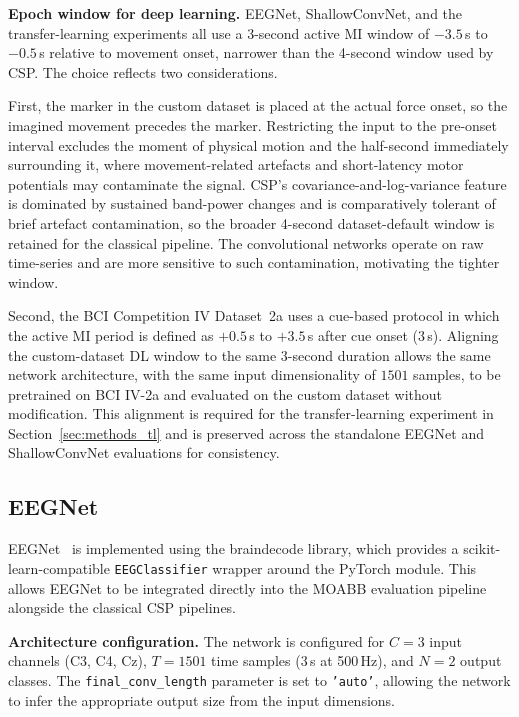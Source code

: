 \documentclass[english, bc, kiv, he, iso690alph, pdf]{fasthesis}
\begin{document}
\textbf{Epoch window for deep learning.} EEGNet, ShallowConvNet, and the transfer-learning experiments all use a 3-second active MI window of $-3.5$\,s to $-0.5$\,s relative to movement onset, narrower than the 4-second window used by CSP. The choice reflects two considerations.

First, the marker in the custom dataset is placed at the actual force onset, so the imagined movement precedes the marker. Restricting the input to the pre-onset interval excludes the moment of physical motion and the half-second immediately surrounding it, where movement-related artefacts and short-latency motor potentials may contaminate the signal. CSP's covariance-and-log-variance feature is dominated by sustained band-power changes and is comparatively tolerant of brief artefact contamination, so the broader 4-second dataset-default window is retained for the classical pipeline. The convolutional networks operate on raw time-series and are more sensitive to such contamination, motivating the tighter window.

Second, the BCI Competition IV Dataset~2a uses a cue-based protocol in which the active MI period is defined as $+0.5$\,s to $+3.5$\,s after cue onset (3\,s). Aligning the custom-dataset DL window to the same 3-second duration allows the same network architecture, with the same input dimensionality of $1501$ samples, to be pretrained on BCI IV-2a and evaluated on the custom dataset without modification. This alignment is required for the transfer-learning experiment in Section~\ref{sec:methods_tl} and is preserved across the standalone EEGNet and ShallowConvNet evaluations for consistency.

\subsection{EEGNet}

EEGNet~\cite{lawhern2018eegnet} is implemented using the braindecode library, which provides a scikit-learn-compatible \texttt{EEGClassifier} wrapper around the PyTorch module. This allows EEGNet to be integrated directly into the MOABB evaluation pipeline alongside the classical CSP pipelines.

\textbf{Architecture configuration.} The network is configured for $C = 3$ input channels (C3, C4, Cz), $T = 1501$ time samples (3\,s at 500\,Hz), and $N = 2$ output classes. The \texttt{final\_conv\_length} parameter is set to \texttt{'auto'}, allowing the network to infer the appropriate output size from the input dimensions.
\end{document}
